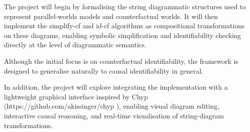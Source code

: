 \documentclass[12pt,a4paper]{article}
\begin{document}
The project will begin by formalising the string diagrammatic structures used to represent parallel-worlds models and counterfactual worlds.
It will then implement the simplify-cf and id-cf algorithms as compositional transformations on these diagrams, enabling symbolic simplification and identifiability checking directly at the level of diagrammatic semantics.

Although the initial focus is on counterfactual identifiability, the framework is designed to generalise naturally to causal identifiability in general.

In addition, the project will explore integrating the implementation with a lightweight graphical interface inspired by Chyp (https://github.com/akissinger/chyp
), enabling visual diagram editing, interactive causal reasoning, and real-time visualisation of string-diagram transformations.
\end{document}
